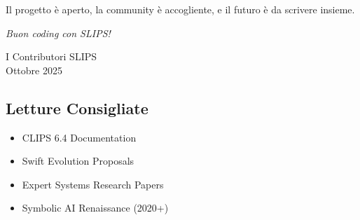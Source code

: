 Il progetto è aperto, la community è accogliente, e il futuro è da scrivere insieme.

\vspace{1cm}

\begin{center}
\textit{Buon coding con SLIPS!}

\bigskip

I Contributori SLIPS \\
Ottobre 2025
\end{center}

\subsection{Letture Consigliate}

\begin{itemize}
\item CLIPS 6.4 Documentation
\item Swift Evolution Proposals
\item Expert Systems Research Papers
\item Symbolic AI Renaissance (2020+)
\end{itemize}
